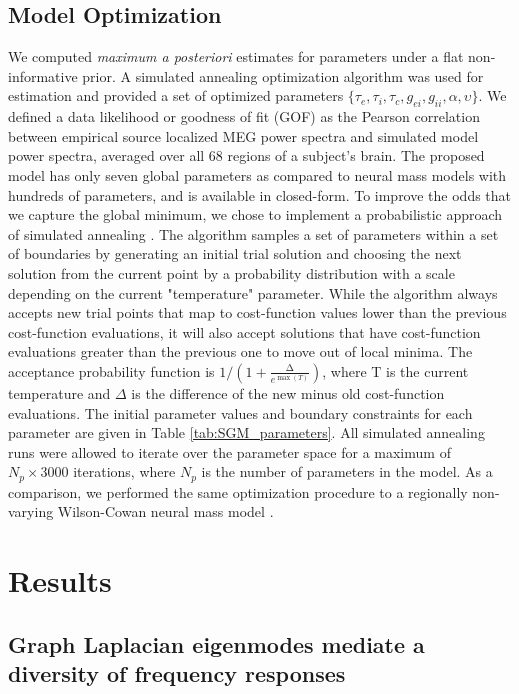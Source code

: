 \subsection{Model Optimization}
We computed \emph{maximum a posteriori} estimates for parameters under a
flat non-informative prior. A simulated annealing optimization algorithm
was used for estimation and provided a set of optimized parameters
$\{\tau_{e}, \tau_{i}, \tau_{c}, g_{ei}, g_{ii}, \alpha, \upsilon\}$.
We defined a data likelihood or goodness of fit (GOF) as the Pearson
correlation between empirical source localized MEG power spectra and
simulated model power spectra, averaged over all 68 regions of a
subject's brain. The proposed model has only seven global parameters as
compared to neural mass models with hundreds of parameters, and is
available in closed-form. To improve the odds that we capture the global
minimum, we chose to implement a probabilistic approach of simulated
annealing \cite{Kirkpatrick1983}. The algorithm samples a set of
parameters within a set of boundaries by generating an initial trial
solution and choosing the next solution from the current point by a
probability distribution with a scale depending on the current
"temperature" parameter. While the algorithm always accepts new trial
points that map to cost-function values lower than the previous
cost-function evaluations, it will also accept solutions that have
cost-function evaluations greater than the previous one to move out of
local minima. The acceptance probability function is
$1/(1 + \frac{\mathrm{\Delta}}{e^{\max(T)}})$, where T is the current
temperature and $\Delta$ is the difference of the new minus old cost-function
evaluations. The initial parameter values and boundary constraints for
each parameter are given in Table \ref{tab:SGM_parameters}. All simulated
annealing runs were allowed to iterate over the parameter space for a
maximum of $N_{p} \times 3000$ iterations, where $N_{p}$ is the
number of parameters in the model. As a comparison, we performed the
same optimization procedure to a regionally non-varying Wilson-Cowan
neural mass model \cite{wilson_mathematical_1973,muldoon_stimulation-based_2016}.

\section{Results}
\subsection{Graph Laplacian eigenmodes mediate a diversity of frequency
responses}

